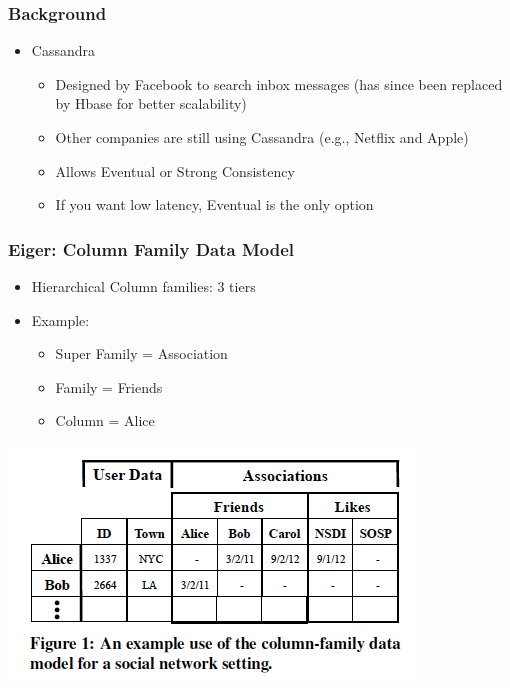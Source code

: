 \documentclass{beamer}
\begin{document}
\begin{frame}
\frametitle{Background}
\begin{itemize}
\item Cassandra
	\begin{itemize}
		\item Designed by Facebook to search inbox messages (has since been replaced by Hbase for better scalability)
		\item Other companies are still using Cassandra (e.g., Netflix and Apple)
		\item Allows Eventual or Strong Consistency
		\item If you want low latency, Eventual is the only option
	\end{itemize}
\end{itemize}  
\end{frame}





\begin{frame}
\frametitle{Eiger: Column Family Data Model}
\begin{itemize}
\item Hierarchical Column families: 3 tiers

\item Example:
	\begin{itemize}
		\item Super Family = Association
		\item Family = Friends
		\item Column = Alice
	\end{itemize}
\end{itemize}  
\includegraphics[scale=0.5]{Figure_Lloyd_ColumnHierarchy.png}
\end{frame}
\end{document}
